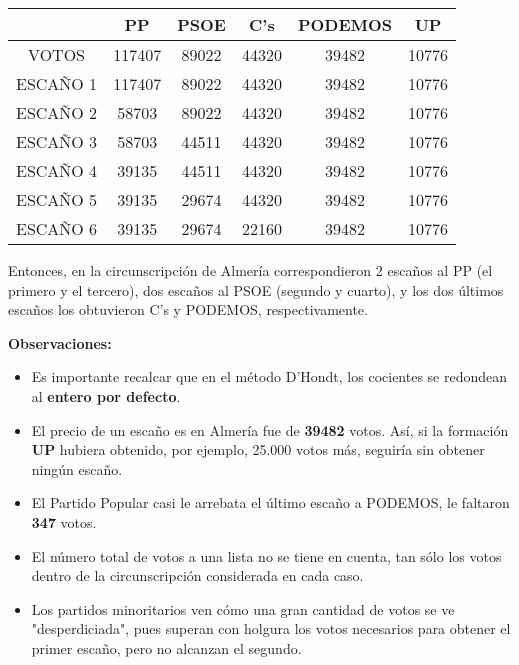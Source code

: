 \documentclass[11pt]{article}
\newcommand\console[1]{{\inconsolata #1}}
\begin{document}
	\console{
		\begin{center}
			\begin{tabular}{|c|c|c|c|c|c|}
				\hline
		 		& \textbf{PP} & \textbf{PSOE} & \textbf{C's} & \textbf{PODEMOS} & \textbf{UP} \\
				\hline
				VOTOS & 117407 & 89022 & 44320 & 39482 & 10776 \\
				\hline
				ESCAÑO 1 &\cellcolor{gray!25} 117407 & 89022 & 44320 & 39482 & 10776 \\
				\hline
				ESCAÑO 2 & 58703 &\cellcolor{gray!25} 89022 & 44320 & 39482 & 10776 \\
				\hline
				ESCAÑO 3 &\cellcolor{gray!25} 58703 & 44511 & 44320 & 39482 & 10776 \\
				\hline
				ESCAÑO 4 & 39135 &\cellcolor{gray!25} 44511 & 44320 & 39482 & 10776 \\
				\hline
				ESCAÑO 5 & 39135 & 29674 &\cellcolor{gray!25} 44320 & 39482 & 10776 \\
				\hline
				ESCAÑO 6 & 39135 & 29674 & 22160 &\cellcolor{gray!25} 39482 & 10776 \\
				\hline
			\end{tabular}
		\end{center}
	}
	
	
\vspace{1em}
  Entonces, en la circunscripción de Almería correspondieron 2 escaños al PP (el primero y el tercero), dos escaños al PSOE (segundo y cuarto), y los dos últimos escaños los obtuvieron C's y PODEMOS, respectivamente.
  
  \textbf{Observaciones:}
  
  \begin{itemize}
  \item Es importante recalcar que en el método D'Hondt, los cocientes se redondean al \textbf{entero por defecto}.
  \item El precio de un escaño es en Almería fue de \textbf{39482} votos. Así, si la formación \textbf{UP} hubiera obtenido, por ejemplo, 25.000 votos más, seguiría sin obtener ningún escaño.
  \item El Partido Popular casi le arrebata el último escaño a PODEMOS, le faltaron \textbf{347} votos.
  \item El número total de votos a una lista no se tiene en cuenta, tan sólo los votos dentro de la circunscripción considerada en cada caso.
  \item Los partidos minoritarios ven cómo una gran cantidad de votos se ve "desperdiciada", pues superan con holgura los votos necesarios para obtener el primer escaño, pero no alcanzan el segundo.
	\end{itemize}
	
\end{document}
